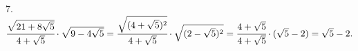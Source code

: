 7. $\cfrac{\sqrt{21+8\sqrt{5}}}{4+\sqrt{5}}\cdot\sqrt{9-4\sqrt{5}}=\cfrac{\sqrt{(4+\sqrt{5})^2}}{4+\sqrt{5}}\cdot\sqrt{(2-\sqrt{5})^2}=
\cfrac{4+\sqrt{5}}{4+\sqrt{5}}\cdot(\sqrt{5}-2)=\sqrt{5}-2.$\\
